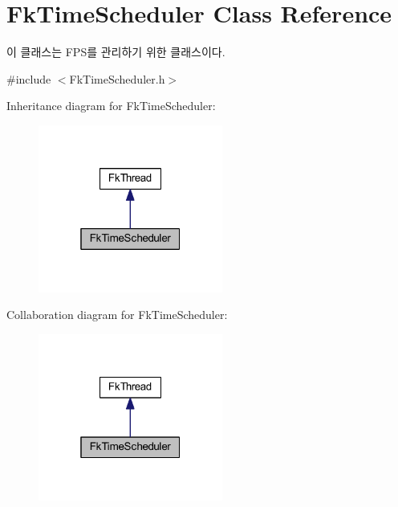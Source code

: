 \hypertarget{class_fk_time_scheduler}{}\section{Fk\+Time\+Scheduler Class Reference}
\label{class_fk_time_scheduler}


이 클래스는 F\+P\+S를 관리하기 위한 클래스이다.  




{\ttfamily \#include $<$Fk\+Time\+Scheduler.\+h$>$}



Inheritance diagram for Fk\+Time\+Scheduler\+:
\nopagebreak
\begin{figure}[H]
\begin{center}
\leavevmode
\includegraphics[width=172pt]{class_fk_time_scheduler__inherit__graph}
\end{center}
\end{figure}


Collaboration diagram for Fk\+Time\+Scheduler\+:
\nopagebreak
\begin{figure}[H]
\begin{center}
\leavevmode
\includegraphics[width=172pt]{class_fk_time_scheduler__coll__graph}
\end{center}
\end{figure}
